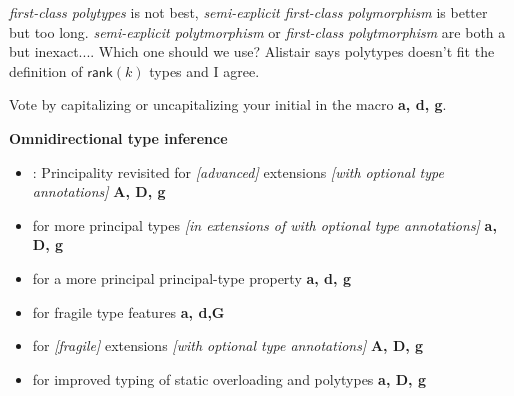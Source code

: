 \documentclass[acmsmall,screen,nonacm]{acmart}
\begin{document}


\Xdidier
  {\emph{first-class polytypes} is not best,
   \emph{semi-explicit first-class polymorphism} is better but too long.
   \emph{semi-explicit polytmorphism} or
   \emph{first-class polytmorphism} are both a but inexact....
   Which one should we use?
   Alistair says polytypes doesn't fit the definition of $\mathsf{rank}(k)$
  types and I agree.}


\begin{version}[Titles]{\blue\True}
\newcommand {\Optional}[1]{{\em [#1]}}
\newcommand {\likes}[1]{\hfill\textbf{#1}}
Vote by capitalizing or uncapitalizing
your initial in the macro \likes{a, d, g}.


\medskip
\noindent \textbf{Omnidirectional type inference}
\begin{itemize}
\item : Principality revisited for \Optional{advanced} \ML extensions
        \Optional {with optional type annotations}
    \likes {A, D, g}


\item for more principal types
      \Optional{in extensions of \ML with optional type annotations}
\likes {a, D, g}

\item for a more principal principal-type property
\likes {a, d, g}

\item for fragile \ML type features
\likes {a, d,G}

\item for \Optional{fragile} \ML extensions \Optional {with optional type annotations}
\likes {A, D, g}

\item for improved typing of static overloading and polytypes
\likes {a, D, g}

\end{itemize}

\end{version}
\end{document}

